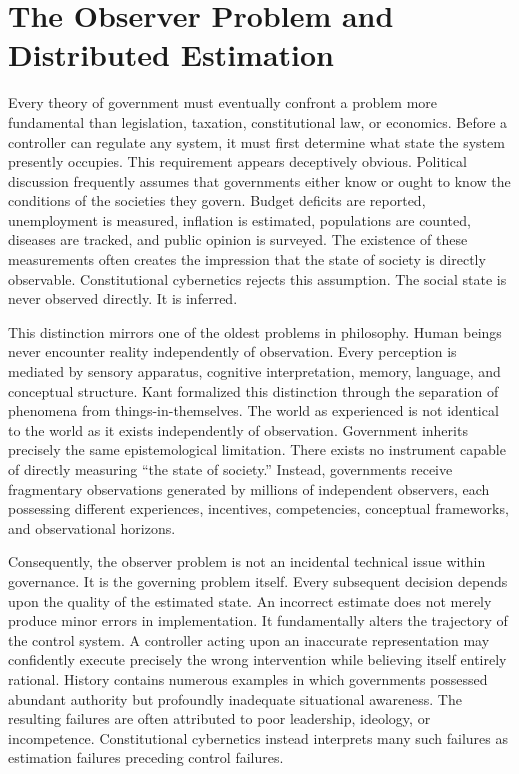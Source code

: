 \documentclass[12pt,a4paper]{article}
\begin{document}
\section{The Observer Problem and Distributed Estimation}

Every theory of government must eventually confront a problem more fundamental than legislation, taxation, constitutional law, or economics. Before a controller can regulate any system, it must first determine what state the system presently occupies. This requirement appears deceptively obvious. Political discussion frequently assumes that governments either know or ought to know the conditions of the societies they govern. Budget deficits are reported, unemployment is measured, inflation is estimated, populations are counted, diseases are tracked, and public opinion is surveyed. The existence of these measurements often creates the impression that the state of society is directly observable. Constitutional cybernetics rejects this assumption. The social state is never observed directly. It is inferred.

This distinction mirrors one of the oldest problems in philosophy. Human beings never encounter reality independently of observation. Every perception is mediated by sensory apparatus, cognitive interpretation, memory, language, and conceptual structure. Kant formalized this distinction through the separation of phenomena from things-in-themselves. The world as experienced is not identical to the world as it exists independently of observation. Government inherits precisely the same epistemological limitation. There exists no instrument capable of directly measuring ``the state of society.'' Instead, governments receive fragmentary observations generated by millions of independent observers, each possessing different experiences, incentives, competencies, conceptual frameworks, and observational horizons.

Consequently, the observer problem is not an incidental technical issue within governance. It is the governing problem itself. Every subsequent decision depends upon the quality of the estimated state. An incorrect estimate does not merely produce minor errors in implementation. It fundamentally alters the trajectory of the control system. A controller acting upon an inaccurate representation may confidently execute precisely the wrong intervention while believing itself entirely rational. History contains numerous examples in which governments possessed abundant authority but profoundly inadequate situational awareness. The resulting failures are often attributed to poor leadership, ideology, or incompetence. Constitutional cybernetics instead interprets many such failures as estimation failures preceding control failures.
\end{document}
